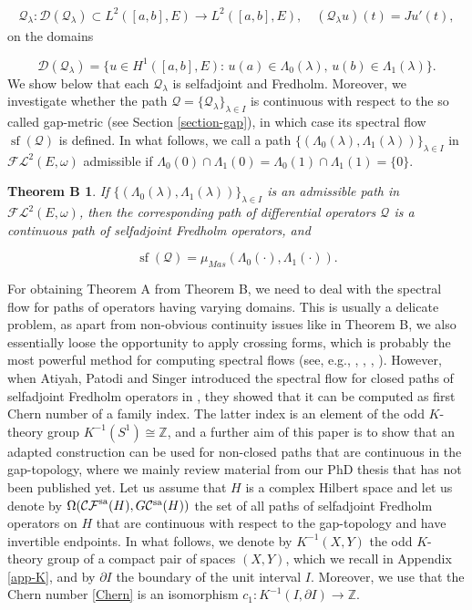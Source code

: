 \documentclass[a4paper,10pt]{article}
\newtheorem*{theoremB}{Theorem B}
\DeclareMathOperator{\sfl}{sf}
\begin{document}
\begin{align}\label{Qopp}
\mathcal{Q}_\lambda:\mathcal{D}(\mathcal{Q}_\lambda)\subset L^2([a,b],E)\rightarrow L^2([a,b],E),\quad (\mathcal{Q}_\lambda u)(t)=Ju'(t),
\end{align}
on the domains

\[\mathcal{D}(\mathcal{Q}_\lambda)=\{u\in H^1([a,b],E):\, u(a)\in\Lambda_0(\lambda),\, u(b)\in\Lambda_1(\lambda)\}.\]
We show below that each $\mathcal{Q}_\lambda$ is selfadjoint and Fredholm. Moreover, we investigate whether the path $\mathcal{Q}=\{\mathcal{Q}_\lambda\}_{\lambda\in I}$ is continuous with respect to the so called gap-metric (see Section \ref{section-gap}), in which case its spectral flow $\sfl(\mathcal{Q})$ is defined. In what follows, we call a path $\{(\Lambda_0(\lambda),\Lambda_1(\lambda))\}_{\lambda\in I}$ in $\mathcal{FL}^2(E,\omega)$ admissible if $\Lambda_0(0)\cap\Lambda_1(0)=\Lambda_0(1)\cap\Lambda_1(1)=\{0\}$.


\begin{theoremB}
If $\{(\Lambda_0(\lambda),\Lambda_1(\lambda))\}_{\lambda\in I}$ is an admissible path in $\mathcal{FL}^2(E,\omega)$, then the corresponding path of differential operators $\mathcal{Q}$ is a continuous path of selfadjoint Fredholm operators, and

\[\sfl(\mathcal{Q})=\mu_{Mas}(\Lambda_0(\cdot),\Lambda_1(\cdot)).\]
\end{theoremB}
\noindent
For obtaining Theorem A from Theorem B, we need to deal with the spectral flow for paths of operators having varying domains. This is usually a delicate problem, as apart from non-obvious continuity issues like in Theorem B, we also essentially loose the opportunity to apply crossing forms, which is probably the most powerful method for computing spectral flows (see, e.g., \cite{Robin}, \cite{FPR}, \cite{FPRII}, \cite{WaterstraatHomoclinics}). However, when Atiyah, Patodi and Singer introduced the spectral flow for closed paths of selfadjoint Fredholm operators in \cite{APS}, they showed that it can be computed as first Chern number of a family index. The latter index is an element of the odd $K$-theory group $K^{-1}(S^1)\cong \mathbb{Z}$, and a further aim of this paper is to show that an adapted construction can be used for non-closed paths that are continuous in the gap-topology, where we mainly review material from our PhD thesis \cite{thesis} that has not been published yet. Let us assume that $H$ is a complex Hilbert space and let us denote by $\Omega(\mathcal{CF}^\textup{sa}(H),G\mathcal{C}^\textup{sa}(H))$ the set of all paths of selfadjoint Fredholm operators on $H$ that are continuous with respect to the gap-topology and have invertible endpoints. In what follows, we denote by $K^{-1}(X,Y)$ the odd $K$-theory group of a compact pair of spaces $(X,Y)$, which we recall in Appendix \ref{app-K}, and by $\partial I$ the boundary of the unit interval $I$. Moreover, we use that the Chern number \eqref{Chern} is an isomorphism $c_1:K^{-1}(I,\partial I)\rightarrow\mathbb{Z}$.    
\end{document}
